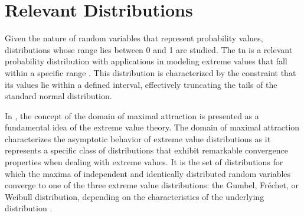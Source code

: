 \section{Relevant Distributions}

Given the nature of random variables that represent probability values, 
distributions whose range lies between 0 and 1 are studied. The \gls{tn} is 
a relevant probability distribution with applications in modeling extreme 
values that fall within a specific range \cite{burkardt2014truncated}. This 
distribution is characterized by the constraint that its values lie within a 
defined interval, effectively truncating the tails of the standard normal 
distribution.

In \cite{david2004order}, the concept of the domain of maximal attraction is 
presented as a fundamental idea of the extreme value theory. The domain of maximal attraction
 characterizes the asymptotic 
behavior of extreme value distributions as it represents a specific class of 
distributions that exhibit remarkable convergence properties when dealing with 
extreme values. It is the set of distributions for which the maxima of independent 
and identically distributed random variables converge to one of the three extreme 
value distributions: the Gumbel, Fréchet, or Weibull distribution, depending on 
the characteristics of the underlying distribution \cite{gorgoso2014use}.